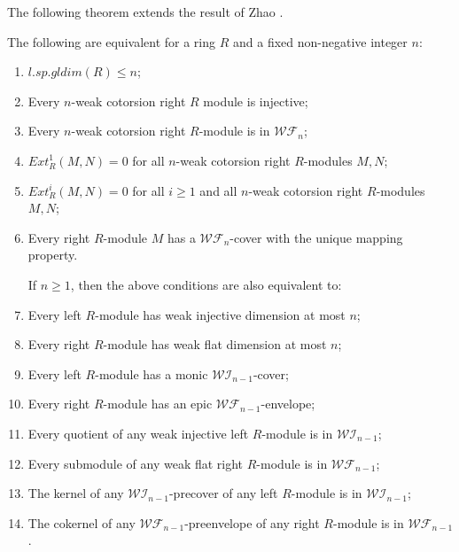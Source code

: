 ﻿\documentclass[
11pt,%
tightenlines,%
twoside,%
onecolumn,%
nofloats,%
nobibnotes,%
nofootinbib,%
superscriptaddress,%
noshowpacs,%
centertags]%
{revtex4}
\begin{document}
 The following theorem extends the result of Zhao \cite[Proposition $4.12$]{Zo}.

\begin{theorem} \label{tm2}
The following are equivalent for a ring $R$ and a fixed non-negative integer $n$:
\begin{enumerate}
\item $l.sp.gldim(R) \leq n$;
\item Every $n$-weak cotorsion right $R$ module is injective;
\item Every $n$-weak cotorsion right $R$-module is in $\mathcal{WF}_n$;
\item $Ext_R^{1}(M, N) = 0$ for all $n$-weak cotorsion right $R$-modules $M, N$;
\item $Ext_R^{i}(M, N) = 0$ for all $i \geq 1$ and all $n$-weak cotorsion right $R$-modules $M, N$;
\item Every right $R$-module $M$ has a $\mathcal{WF}_n$-cover with the unique mapping property.

\begin{flushleft}
\par If $n \geq 1$, then the above conditions are also equivalent to:
\end{flushleft}

\item Every left $R$-module has weak injective dimension at most $n$;
\item Every right $R$-module has weak flat dimension at most $n$;
\item Every left $R$-module has a monic $\mathcal{WI}_{n-1}$-cover;
\item Every right $R$-module has an epic $\mathcal{WF}_{n-1}$-envelope;
\item Every quotient of any weak injective left $R$-module is in $\mathcal{WI}_{n-1}$;
\item Every submodule of any weak flat right $R$-module is in $\mathcal{WF}_{n-1}$;
\item The kernel of any $\mathcal{WI}_{n-1}$-precover of any left $R$-module is in $\mathcal{WI}_{n-1}$;
\item The cokernel of any $\mathcal{WF}_{n-1}$-preenvelope of any right $R$-module is in $\mathcal{WF}_{n-1}$.
\end{enumerate}
\end{theorem}
\end{document}
